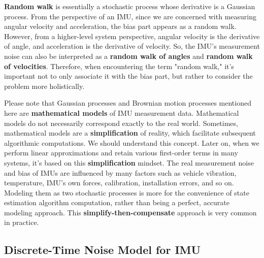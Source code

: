 \textbf{Random walk} is essentially a stochastic process whose derivative is a Gaussian process. From the perspective of an IMU, since we are concerned with measuring angular velocity and acceleration, the bias part appears as a random walk. However, from a higher-level system perspective, angular velocity is the derivative of angle, and acceleration is the derivative of velocity. So, the IMU's measurement noise can also be interpreted as a \textbf{random walk of angles} and \textbf{random walk of velocities}. Therefore, when encountering the term "random walk," it's important not to only associate it with the bias part, but rather to consider the problem more holistically.

Please note that Gaussian processes and Brownian motion processes mentioned here are \textbf{mathematical models} of IMU measurement data. Mathematical models do not necessarily correspond exactly to the real world. Sometimes, mathematical models are a \textbf{simplification} of reality, which facilitate subsequent algorithmic computations. We should understand this concept. Later on, when we perform linear approximations and retain various first-order terms in many systems, it's based on this \textbf{simplification} mindset. The real measurement noise and bias of IMUs are influenced by many factors such as vehicle vibration, temperature, IMU's own forces, calibration, installation errors, and so on. Modeling them as two stochastic processes is more for the convenience of state estimation algorithm computation, rather than being a perfect, accurate modeling approach. This \textbf{simplify-then-compensate} approach is very common in practice.

\subsection{Discrete-Time Noise Model for IMU}

